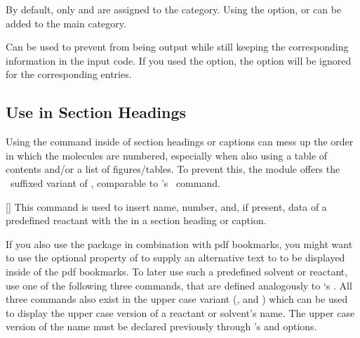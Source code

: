 \documentclass{chemmacros-manual}
\begin{document}
\begin{options}
    By default, only  and  are assigned to the
     category. Using the  option,   or
     can be added to the main category. 
\end{options}
  
\begin{example}
  \par
  \par
\end{example}

\begin{options}
    Can be used to prevent  from being output while still keeping
    the corresponding information in the input code. If you used the
     option, the  option will be
    ignored for the corresponding entries.
\end{options}

\subsection{Use in Section Headings}\label{sec:reactants-in-headings}

Using the  command inside of section headings or captions can
mess up the order in which the molecules are numbered, especially when also
using a table of contents and/or a list of figures/tables. To prevent this,
the  module offers the \parg\ suffixed variant of
, comparable to 's \parg\ command.

\begin{commands}
  [\parg{}]
    This command is used to insert name, number, and, if present, data of a
    predefined reactant with the  in a section heading or caption.
\end{commands}

If you also use the  package in combination with \ac{pdf}
bookmarks, you might want to use the optional  property of
 to supply an alternative text to  to be
displayed inside of the \ac{pdf} bookmarks. To later use such a predefined
solvent or reactant, use one of the following three commands, that are defined
analogously to `s . All three commands also exist
in the upper case variant (,  and
) which can be used to display the upper case version of a
reactant or solvent's name. The upper case version of the name must be declared
previously through 's  and
 options.
\end{document}

